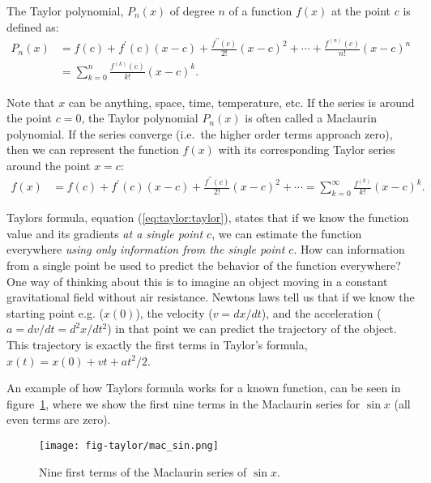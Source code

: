 \documentclass[graybox,sectrefs,envcountresetchap,open=right,final]{svmonodo}
\newenvironment{graybox2admon}[1][]{
\begin{graybox2mdframed}[frametitle=#1]
}
{
\end{graybox2mdframed}
}
\begin{document}
\begin{graybox2admon}[Taylor polynomial:]
The Taylor polynomial, $P_n(x)$ of degree $n$ of a function $f(x)$ at the point $c$ is defined as:
\begin{align}
 P_n(x) &= f(c)+f^\prime(c)(x-c)+\frac{f^{\prime\prime}(c)}{2!}(x-c)^2+\cdots+\frac{f^{(n)}(c)}{n!}(x-c)^n\nonumber\\ 
&=\sum_{k=0}^n\frac{f^{(k)}(c)}{k!}(x-c)^k.\label{eq:taylor:taylori}
\end{align}
\end{graybox2admon}



Note that $x$ can be anything, space, time, temperature, etc. If the series is around the point $c=0$, the Taylor polynomial $P_n(x)$ is often called a Maclaurin polynomial. If the series converge (i.e.~the higher order terms approach zero), then we can represent the function $f(x)$ with its corresponding Taylor series around the point $x=c$:
\begin{align}
 f(x) &= f(c)+f^\prime(c)(x-c)+\frac{f^{\prime\prime}(c)}{2!}(x-c)^2+\cdots
=\sum_{k=0}^\infty\frac{f^{(k)}}{k!}(x-c)^k.\label{eq:taylor:taylor}
\end{align}


\begin{graybox2admon}[The magic of Taylors formula]
Taylors formula, equation (\ref{eq:taylor:taylor}), states that if we know the function value and its gradients \emph{at a single point $c$}, we can estimate the function everywhere \emph{using only  information from the single point $c$}. How can information from a single point be used to predict the behavior of the function everywhere? One way of thinking about this is to imagine an object moving in a constant gravitational field without air resistance. Newtons laws tell us that  if we know the starting point e.g. ($x(0)$), the velocity ($v=dx/dt$), and the acceleration ($a=dv/dt=d^2x/dt^2$) in that point we can predict the trajectory of the object. This trajectory is exactly the first terms in Taylor's formula, $x(t)=x(0) + vt+at^2/2$.
\end{graybox2admon}



An example of how Taylors formula works for a known function, can be seen in figure~\ref{fig:mac_sin}, where we show the first nine terms in the Maclaurin series for $\sin x$ (all even terms are zero). 

\begin{figure}[!ht]  %
  \centerline{\texttt{[image: fig-taylor/mac\_sin.png]}}
  \caption{
  Nine first terms of the Maclaurin series of $\sin x$. \label{fig:mac_sin}
  }
\end{figure}
\end{document}
